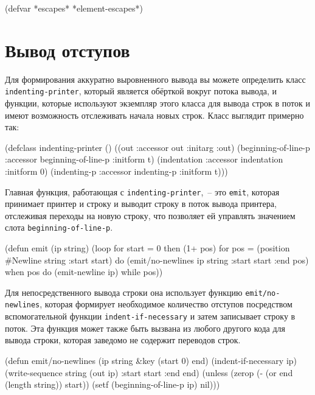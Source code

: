 \begin{myverb}
(defvar *escapes* *element-escapes*)
\end{myverb}

\section{Вывод отступов}

Для формирования аккуратно выровненного вывода вы можете определить класс
\lstinline{indenting-printer}, который является обёрткой вокруг потока вывода, и функции,
которые используют экземпляр этого класса для вывода строк в поток и имеют возможность
отслеживать начала новых строк. Класс выглядит примерно так:

\begin{myverb}
(defclass indenting-printer ()
  ((out                 :accessor out                 :initarg :out)
   (beginning-of-line-p :accessor beginning-of-line-p :initform t)
   (indentation         :accessor indentation         :initform 0)
   (indenting-p         :accessor indenting-p         :initform t)))
\end{myverb}

Главная функция, работающая с \lstinline{indenting-printer},~-- это \lstinline{emit}, которая принимает
принтер и строку и выводит строку в поток вывода принтера, отслеживая переходы на новую
строку, что позволяет ей управлять значением слота \lstinline{beginning-of-line-p}.

\begin{myverb}
(defun emit (ip string)
  (loop for start = 0 then (1+ pos)
     for pos = (position #\bslash{}Newline string :start start)
     do (emit/no-newlines ip string :start start :end pos)
     when pos do (emit-newline ip)
     while pos))
\end{myverb}

Для непосредственного вывода строки она использует функцию \lstinline{emit/no-newlines},
которая формирует необходимое количество отступов посредством вспомогательной функции
\lstinline{indent-if-necessary} и затем записывает строку в поток.  Эта функция может также
быть вызвана из любого другого кода для вывода строки, которая заведомо не содержит
переводов строк.

\begin{myverb}
(defun emit/no-newlines (ip string &key (start 0) end)
  (indent-if-necessary ip)
  (write-sequence string (out ip) :start start :end end)
  (unless (zerop (- (or end (length string)) start))
    (setf (beginning-of-line-p ip) nil)))
\end{myverb}

